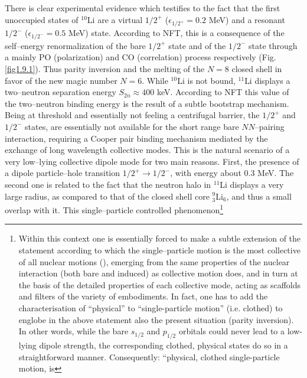 There is clear experimental evidence which testifies to the fact that the first unoccupied states of $^{10}$Li are a virtual $1/2^+$ ($\epsilon_{1/2^+}=0.2$ MeV) and a resonant $1/2^-$ ($\epsilon_{1/2^-}=0.5$ MeV) state. According to NFT, this is a consequence of the self--energy renormalization of the bare $1/2^+$ state and of the $1/2^-$ state through a mainly PO (polarization) and CO (correlation) process respectively (Fig. \ref{fig1.9.1}). Thus parity inversion and the melting of  the $N=8$ closed shell in favor of the new magic number $N=6$. While $^{10}$Li is not bound, $^{11}$Li displays a two--neutron separation energy $S_{2n}\approx400$ keV. According to NFT this value of the two--neutron binding energy is the result of a subtle bootstrap mechanism. Being at threshold and essentially not feeling a centrifugal barrier, the $1/2^+$ and $1/2^-$ states, are essentially not available for the short range bare $NN$--pairing interaction, requiring a Cooper pair binding mechanism mediated by  the exchange of  long wavelength collective modes. This is the natural scenario of a very low--lying collective dipole mode for two main reasons. First, the presence of a dipole particle--hole transition $1/2^+\rightarrow 1/2^-$, with energy about 0.3 MeV. The second one is related to  the fact that the neutron halo in $^{11}$Li displays a very large radius, as compared to that of the closed shell core $^9_3$Li$_6$, and thus a small overlap with it. This single--particle controlled phenomenon\footnote{Within this context one is essentially forced to make a subtle  extension of the statement according to which  the single--particle motion is the most collective  
of all nuclear motions (\cite{Mottelson:62}), emerging from  the same properties  of the nuclear interaction 
(both bare and induced) as collective motion does, 
and in turn at the basis of the detailed properties of each collective mode, acting as
 scaffolds and filters of the variety of embodiments. In fact, one 
has  to add the characterisation of ``physical'' to ``single-particle motion'' (i.e. clothed) to englobe in  the above statement 
also the present  situation (parity inversion). In other words, while the bare $s_{1/2}$ and $p_{1/2}$ orbitals could never lead to a low-lying dipole strength, the corresponding 
 clothed, physical states do so in a straightforward manner. Consequently: ``physical,  clothed single-particle motion, is 
}
